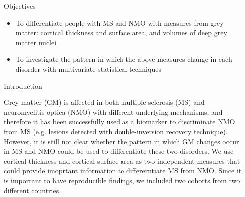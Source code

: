 \documentclass[final]{beamer}
\newlength{\sepwid}
\newlength{\onecolwid}
\begin{document}
\begin{frame}[t] %

\begin{columns}[t] %

\begin{column}{\sepwid}\end{column} %

\begin{column}{\onecolwid} %


\begin{alertblock}{Objectives}


\begin{itemize}
\item To differentiate people with MS and NMO with measures from grey matter: cortical thickness and 
surface area, and volumes of deep grey matter nuclei
\item To investigate the pattern in which the above measures change in each disorder with multivariate statistical techniques

\end{itemize}

\end{alertblock}


\begin{block}{Introduction}

Grey matter (GM) is affected in both multiple sclerosis (MS) and neuromyelitis optica (NMO) with different underlying mechanisms, and therefore it has been successfully used as a biomarker to discriminate NMO from MS (e.g. lesions detected with double-inversion recovery technique). 
However, it is still not clear whether the pattern in which GM changes occur in MS and NMO could be used to differentiate these  two disorders. We use cortical thickness and cortical surface area as two independent measures that could provide imoprtant information to differerntiate MS from NMO. Since it is important to have reproducible findings, we included two cohorts from two different countries. 




\end{block}
\end{column}
\end{columns}
\end{frame}
\end{document}
